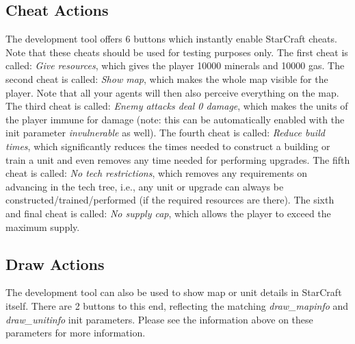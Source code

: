 \subsection{Cheat Actions}
The development tool offers 6 buttons which instantly enable StarCraft cheats. Note that these cheats should be used for testing purposes only. The first cheat is called: \textit{Give resources}, which gives the player 10000 minerals and 10000 gas. The second cheat is called: \textit{Show map}, which makes the whole map visible for the player. Note that all your agents will then also perceive everything on the map. The third cheat is called: \textit{Enemy attacks deal 0 damage}, which makes the units of the player immune for damage (note: this can be automatically enabled with the init parameter \textit{invulnerable} as well). The fourth cheat is called: \textit{Reduce build times}, which significantly reduces the times needed to construct a building or train a unit and even removes any time needed for performing upgrades. The fifth cheat is called: \textit{No tech restrictions}, which removes any requirements on advancing in the tech tree, i.e., any unit or upgrade can always be constructed/trained/performed (if the required resources are there). The sixth and final cheat is called: \textit{No supply cap}, which allows the player to exceed the maximum supply.

\subsection{Draw Actions}
The development tool can also be used to show map or unit details in StarCraft itself. There are 2 buttons to this end, reflecting the matching \textit{draw\_mapinfo} and \textit{draw\_unitinfo} init parameters. Please see the information above on these parameters for more information.